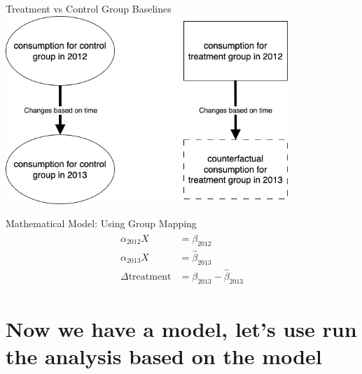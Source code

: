 \documentclass{beamer}
\begin{document}
\begin{frame}{Treatment vs Control Group Baselines}
  \centering
  \includegraphics[width=0.8\textwidth]{images/yoy-mapping.png}
\end{frame}

\begin{frame}{Mathematical Model: Using Group Mapping}
  \begin{align}
    \begin{split}
        \alpha_{2012} X &= \beta_{2012} \\
        \alpha_{2013} X &= \hat\beta_{2013} \\
        \Delta\mbox{treatment} &= \beta_{2013} - \hat\beta_{2013}
    \end{split}
  \end{align}
\end{frame}

\section{Now we have a model, let's use run the analysis based on the model}
\end{document}
